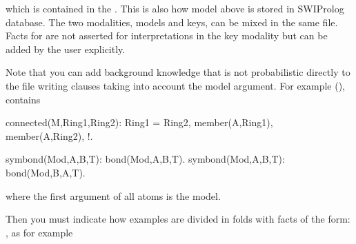 \documentclass[letterpaper,10pt,english]{sphinxmanual}
\begin{document}
\begin{sphinxVerbatim}[commandchars=\\\{\}]
\end{sphinxVerbatim}

\sphinxAtStartPar
which is contained in the .
This is also how model  above is stored in SWI\sphinxhyphen{}Prolog database.
The two modalities, models and keys, can be mixed in the same file.
Facts for  are not asserted for interpretations in the key modality but can be added by the user explicitly.

\sphinxAtStartPar
Note that you can add background knowledge that is not probabilistic directly to the file writing clauses taking into account the model argument.
For example (), contains

\begin{sphinxVerbatim}[commandchars=\\\{\}]
connected(\PYGZus{}M,Ring1,Ring2):\PYGZhy{}
        Ring1 \PYGZbs{}= Ring2,
        member(A,Ring1),
        member(A,Ring2), !.

symbond(Mod,A,B,T):\PYGZhy{} bond(Mod,A,B,T).
symbond(Mod,A,B,T):\PYGZhy{} bond(Mod,B,A,T).
\end{sphinxVerbatim}

\sphinxAtStartPar
where the first argument of all atoms is the model.

\sphinxAtStartPar
Then you must indicate how examples are divided in folds with facts of the form: , as for example
\end{document}
